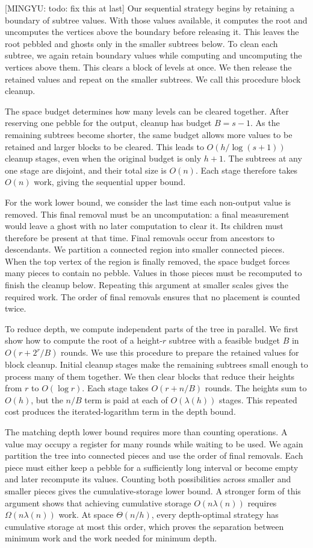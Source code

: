 \documentclass[11pt]{article}
\theoremstyle{definition}
\theoremstyle{remark}
\newcommand{\mingyu}[1]{{\color{magenta}\footnotesize [MINGYU: #1]}} %
\begin{document}
\mingyu{todo: fix this at last}
Our sequential strategy begins by retaining a boundary of subtree values. With those values available, it computes the root and uncomputes the vertices above the boundary before releasing it. This leaves the root pebbled and ghosts only in the smaller subtrees below. To clean each subtree, we again retain boundary values while computing and uncomputing the vertices above them. This clears a block of levels at once. We then release the retained values and repeat on the smaller subtrees. We call this procedure block cleanup.

The space budget determines how many levels can be cleared together. After reserving one pebble for the output, cleanup has budget $B=s-1$. As the remaining subtrees become shorter, the same budget allows more values to be retained and larger blocks to be cleared. This leads to $O(h/\log(s+1))$ cleanup stages, even when the original budget is only $h+1$. The subtrees at any one stage are disjoint, and their total size is $O(n)$. Each stage therefore takes $O(n)$ work, giving the sequential upper bound.

For the work lower bound, we consider the last time each non-output value is removed. This final removal must be an uncomputation: a final measurement would leave a ghost with no later computation to clear it. Its children must therefore be present at that time. Final removals occur from ancestors to descendants. We partition a connected region into smaller connected pieces. When the top vertex of the region is finally removed, the space budget forces many pieces to contain no pebble. Values in those pieces must be recomputed to finish the cleanup below. Repeating this argument at smaller scales gives the required work. The order of final removals ensures that no placement is counted twice.

To reduce depth, we compute independent parts of the tree in parallel. We first show how to compute the root of a height-$r$ subtree with a feasible budget $B$ in $O(r+2^r/B)$ rounds. We use this procedure to prepare the retained values for block cleanup. Initial cleanup stages make the remaining subtrees small enough to process many of them together. We then clear blocks that reduce their heights from $r$ to $O(\log r)$. Each stage takes $O(r+n/B)$ rounds. The heights sum to $O(h)$, but the $n/B$ term is paid at each of $O(\lambda(h))$ stages. This repeated cost produces the iterated-logarithm term in the depth bound.

The matching depth lower bound requires more than counting operations. A value may occupy a register for many rounds while waiting to be used. We again partition the tree into connected pieces and use the order of final removals. Each piece must either keep a pebble for a sufficiently long interval or become empty and later recompute its values. Counting both possibilities across smaller and smaller pieces gives the cumulative-storage lower bound. A stronger form of this argument shows that achieving cumulative storage $O(n\lambda(n))$ requires $\Omega(n\lambda(n))$ work. At space $\Theta(n/h)$, every depth-optimal strategy has cumulative storage at most this order, which proves the separation between minimum work and the work needed for minimum depth.
\end{document}
